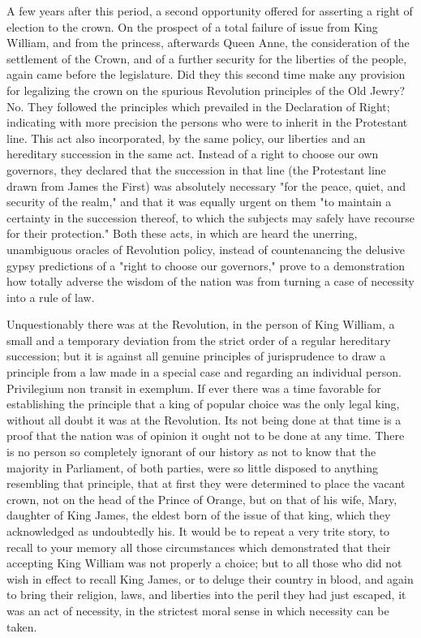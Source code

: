 A few years after this period, a second opportunity offered for asserting a right of election to the crown. On the prospect of a total failure of issue from King William, and from the princess, afterwards Queen Anne, the consideration of the settlement of the Crown, and of a further security for the liberties of the people, again came before the legislature. Did they this second time make any provision for legalizing the crown on the spurious Revolution principles of the Old Jewry? No. They followed the principles which prevailed in the Declaration of Right; indicating with more precision the persons who were to inherit in the Protestant line. This act also incorporated, by the same policy, our liberties and an hereditary succession in the same act. Instead of a right to choose our own governors, they declared that the succession in that line (the Protestant line drawn from James the First) was absolutely necessary "for the peace, quiet, and security of the realm," and that it was equally urgent on them "to maintain a certainty in the succession thereof, to which the subjects may safely have recourse for their protection." Both these acts, in which are heard the unerring, unambiguous oracles of Revolution policy, instead of countenancing the delusive gypsy predictions of a "right to choose our governors," prove to a demonstration how totally adverse the wisdom of the nation was from turning a case of necessity into a rule of law.

Unquestionably there was at the Revolution, in the person of King William, a small and a temporary deviation from the strict order of a regular hereditary succession; but it is against all genuine principles of jurisprudence to draw a principle from a law made in a special case and regarding an individual person. Privilegium non transit in exemplum. If ever there was a time favorable for establishing the principle that a king of popular choice was the only legal king, without all doubt it was at the Revolution. Its not being done at that time is a proof that the nation was of opinion it ought not to be done at any time. There is no person so completely ignorant of our history as not to know that the majority in Parliament, of both parties, were so little disposed to anything resembling that principle, that at first they were determined to place the vacant crown, not on the head of the Prince of Orange, but on that of his wife, Mary, daughter of King James, the eldest born of the issue of that king, which they acknowledged as undoubtedly his. It would be to repeat a very trite story, to recall to your memory all those circumstances which demonstrated that their accepting King William was not properly a choice; but to all those who did not wish in effect to recall King James, or to deluge their country in blood, and again to bring their religion, laws, and liberties into the peril they had just escaped, it was an act of necessity, in the strictest moral sense in which necessity can be taken.


